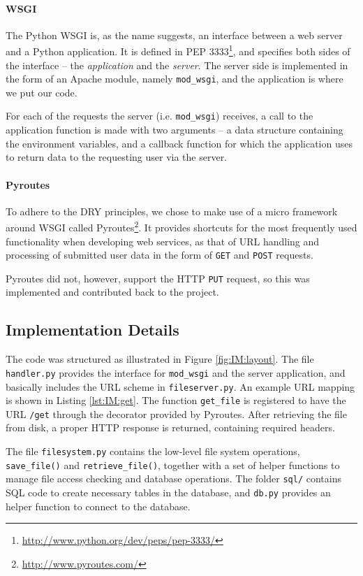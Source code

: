 \documentclass[pdftex,english,10pt,b5paper,twoside]{book}
\begin{document}
\paragraph{\acs{WSGI}} The Python \ac{WSGI} is, as the name suggests, an
interface between a web server and a Python application. It is defined in
\ac{PEP} 3333\footnote{\url{http://www.python.org/dev/peps/pep-3333/}}, and
specifies both sides of the interface -- the \emph{application} and the
\emph{server}. The server side is implemented in the form of an Apache 
module, namely \texttt{mod\_wsgi}, and the application is where we put our
code.

For each of the requests the server (i.e. \texttt{mod\_wsgi}) receives, a call
to the application function is made with two arguments -- a data structure
containing the environment variables, and a callback function for which the
application uses to return data to the requesting user via the server.

\paragraph{Pyroutes} To adhere to the \ac{DRY} principles, we chose to make use
of a micro framework around \ac{WSGI} called
Pyroutes\footnote{\url{http://www.pyroutes.com/}}. It provides shortcuts for the
most frequently used functionality when developing web services, as that of
\ac{URL} handling and processing of submitted user data in the form of
\texttt{GET} and \texttt{POST} requests.

Pyroutes did not, however, support the HTTP \texttt{PUT} request, so this was
implemented and contributed back to the project.

\subsection{Implementation Details}

The code was structured as illustrated in Figure \ref{fig:IM:layout}. The file
\texttt{handler.py} provides the interface for \texttt{mod\_wsgi} and the server
application, and basically includes the \ac{URL} scheme in
\texttt{fileserver.py}. An example \ac{URL} mapping is shown in Listing
\ref{lst:IM:get}. The function \texttt{get\_file} is registered to have the
\ac{URL} \texttt{/get} through the decorator provided by Pyroutes. After
retrieving the file from disk, a proper \ac{HTTP} response is returned,
containing required headers.

The file \texttt{filesystem.py} contains the low-level file system operations,
\texttt{save\_file()} and \texttt{retrieve\_file()}, together with a set of
helper functions to manage file access checking and database operations.  The
folder \texttt{sql/} contains \ac{SQL} code to create necessary tables in the
database, and \texttt{db.py} provides an helper function to connect to the
database.
\end{document}
